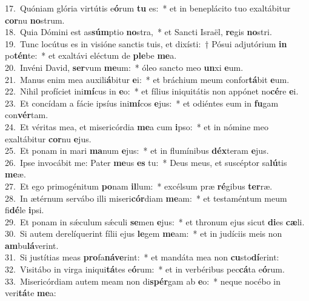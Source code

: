 {17.~}Quóniam glória virtútis e\textbf{ó}rum \textbf{tu} es:~* et in beneplácito tuo exaltábitur \textbf{cor}nu \textbf{no}strum.\\
{18.~}Quia Dómini est as\textbf{súm}ptio \textbf{no}stra,~* et Sancti Israël, \textbf{re}gis \textbf{no}stri.\\
{19.~}Tunc locútus es in visióne sanctis tuis, et dixísti:~† Pósui adjutórium \textbf{in} po\textbf{tén}te:~* et exaltávi eléctum de \textbf{ple}be \textbf{me}a.\\
{20.~}Invéni David, \textbf{ser}vum \textbf{me}um:~* óleo sancto meo \textbf{un}xi \textbf{e}um.\\
{21.~}Manus enim mea auxili\textbf{á}bitur \textbf{e}i:~* et bráchium meum confor\textbf{tá}bit \textbf{e}um.\\
{22.~}Nihil profíciet ini\textbf{mí}cus in \textbf{e}o:~* et fílius iniquitátis non appónet no\textbf{cé}re \textbf{e}i.\\
{23.~}Et concídam a fácie ipsíus ini\textbf{mí}cos \textbf{e}jus:~* et odiéntes eum in \textbf{fu}gam con\textbf{vér}tam.\\
{24.~}Et véritas mea, et misericórdia \textbf{me}a cum \textbf{i}pso:~* et in nómine meo exaltábitur \textbf{cor}nu \textbf{e}jus.\\
{25.~}Et ponam in mari \textbf{ma}num \textbf{e}jus:~* et in flumínibus \textbf{déx}teram \textbf{e}jus.\\
{26.~}Ipse invocábit me: Pater \textbf{me}us \textbf{es} tu:~* Deus meus, et suscéptor sa\textbf{lú}tis \textbf{me}æ.\\
{27.~}Et ego primogénitum \textbf{po}nam \textbf{il}lum:~* excélsum præ \textbf{ré}gibus \textbf{ter}ræ.\\
{28.~}In ætérnum servábo illi miseri\textbf{cór}diam \textbf{me}am:~* et testaméntum meum fi\textbf{dé}le \textbf{i}psi.\\
{29.~}Et ponam in sǽculum sǽculi \textbf{se}men \textbf{e}jus:~* et thronum ejus sicut \textbf{di}es \textbf{cæ}li.\\
{30.~}Si autem derelíquerint fílii ejus \textbf{le}gem \textbf{me}am:~* et in judíciis meis non \textbf{am}bu\textbf{lá}verint.\\
{31.~}Si justítias meas \textbf{pro}fa\textbf{ná}\textbf{ve}rint:~* et mandáta mea non \textbf{cu}sto\textbf{dí}erint:\\
{32.~}Visitábo in virga iniqui\textbf{tá}tes e\textbf{ó}rum:~* et in verbéribus pec\textbf{cá}ta e\textbf{ó}rum.\\
{33.~}Misericórdiam autem meam non di\textbf{spér}gam ab \textbf{e}o:~* neque nocébo in veri\textbf{tá}te \textbf{me}a:\\
